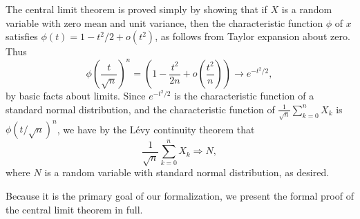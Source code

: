 \documentclass[leqno]{article}
\theoremstyle{definition}
\begin{document}
The central limit theorem is proved simply by showing that if $X$ is a random variable with zero mean and unit variance, then the characteristic function $\phi$ of $x$ satisfies $\phi(t) = 1 - t^2/2 + o(t^2)$, as follows from Taylor expansion about zero. Thus
\[ \phi\left(\frac{t}{\sqrt n}\right)^n = \left(1 - \frac{t^2}{2n} + o\left(\frac{t^2}{n}\right)\right) \rightarrow e^{-t^2/2}, \]
by basic facts about limits. Since $e^{-t^2/2}$ is the characteristic function of a standard normal distribution, and the characteristic function of $\frac{1}{\sqrt n} \sum_{k=0}^n X_k$ is $\phi(t/\sqrt n)^n$, we have by the L\'evy continuity theorem that
\[ \frac{1}{\sqrt n} \sum_{k=0}^n X_k \Rightarrow N, \]
where $N$ is a random variable with standard normal distribution, as desired.

Because it is the primary goal of our formalization, we present the formal proof of the central limit theorem in full.

\medskip
\end{document}
